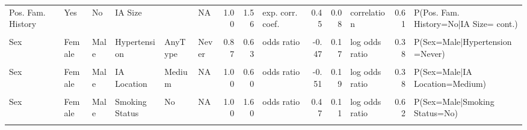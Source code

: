 \begin{landscape}
\begin{table}[!h]
{\begin{tabular}[t]{llllllrrlrrlrl}
\addlinespace
Pos. Fam. History & Yes & No & IA Size &  & NA & 1.00 & 1.56 & exp. corr. coef. & 0.45 & 0.08 & correlation & 0.61 & P(Pos. Fam. History=No|IA Size= cont.)\\
\cellcolor{gray!6}{Pos. Fam. History} & \cellcolor{gray!6}{Yes} & \cellcolor{gray!6}{No} & \cellcolor{gray!6}{Ruptured IA} & \cellcolor{gray!6}{Yes} & \cellcolor{gray!6}{No} & \cellcolor{gray!6}{1.00} & \cellcolor{gray!6}{0.44} & \cellcolor{gray!6}{odds ratio} & \cellcolor{gray!6}{-0.82} & \cellcolor{gray!6}{0.22} & \cellcolor{gray!6}{log odds ratio} & \cellcolor{gray!6}{0.31} & \cellcolor{gray!6}{P(Pos. Fam. History=No|Ruptured IA=No)}\\
Sex & Female & Male & Hypertension & AnyType & Never & 0.87 & 0.63 & odds ratio & -0.47 & 0.17 & log odds ratio & 0.38 & P(Sex=Male|Hypertension=Never)\\
\cellcolor{gray!6}{Sex} & \cellcolor{gray!6}{Female} & \cellcolor{gray!6}{Male} & \cellcolor{gray!6}{IA Location} & \cellcolor{gray!6}{Low} & \cellcolor{gray!6}{NA} & \cellcolor{gray!6}{1.00} & \cellcolor{gray!6}{0.37} & \cellcolor{gray!6}{odds ratio} & \cellcolor{gray!6}{-1.00} & \cellcolor{gray!6}{0.25} & \cellcolor{gray!6}{log odds ratio} & \cellcolor{gray!6}{0.27} & \cellcolor{gray!6}{P(Sex=Male|IA Location=Low)}\\
\addlinespace
Sex & Female & Male & IA Location & Medium & NA & 1.00 & 0.60 & odds ratio & -0.51 & 0.19 & log odds ratio & 0.38 & P(Sex=Male|IA Location=Medium)\\
\cellcolor{gray!6}{Sex} & \cellcolor{gray!6}{Female} & \cellcolor{gray!6}{Male} & \cellcolor{gray!6}{Smoking Status} & \cellcolor{gray!6}{Former} & \cellcolor{gray!6}{NA} & \cellcolor{gray!6}{1.00} & \cellcolor{gray!6}{1.19} & \cellcolor{gray!6}{odds ratio} & \cellcolor{gray!6}{0.17} & \cellcolor{gray!6}{0.22} & \cellcolor{gray!6}{log odds ratio} & \cellcolor{gray!6}{0.54} & \cellcolor{gray!6}{P(Sex=Male|Smoking Status=Former)}\\
Sex & Female & Male & Smoking Status & No & NA & 1.00 & 1.60 & odds ratio & 0.47 & 0.11 & log odds ratio & 0.62 & P(Sex=Male|Smoking Status=No)\\
\cellcolor{gray!6}{Sex} & \cellcolor{gray!6}{intercept} & \cellcolor{gray!6}{NA} & \cellcolor{gray!6}{NA} & \cellcolor{gray!6}{NA} & \cellcolor{gray!6}{NA} & \cellcolor{gray!6}{NA} & \cellcolor{gray!6}{0.37} & \cellcolor{gray!6}{odds ratio} & \cellcolor{gray!6}{-1.00} & \cellcolor{gray!6}{0.08} & \cellcolor{gray!6}{log odds ratio} & \cellcolor{gray!6}{0.27} & \cellcolor{gray!6}{P(Sex=Male)}\\

\end{tabular}}
\end{table}
\end{landscape}
